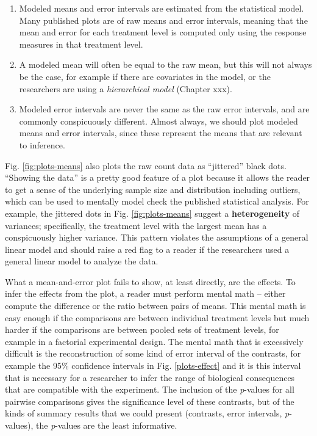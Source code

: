 \documentclass[]{book}
\providecommand{\tightlist}{%
  \setlength{\itemsep}{0pt}\setlength{\parskip}{0pt}}
\begin{document}
\begin{enumerate}
\def\labelenumi{\arabic{enumi}.}
\tightlist
\item
  Modeled means and error intervals are estimated from the statistical
  model. Many published plots are of raw means and error intervals,
  meaning that the mean and error for each treatment level is computed
  only using the response measures in that treatment level.
\item
  A modeled mean will often be equal to the raw mean, but this will not
  always be the case, for example if there are covariates in the model,
  or the researchers are using a \emph{hierarchical model} (Chapter
  xxx).
\item
  Modeled error intervals are never the same as the raw error intervals,
  and are commonly conspicuously different. Almost always, we should
  plot modeled means and error intervals, since these represent the
  means that are relevant to inference.
\end{enumerate}

Fig. \ref{fig:plots-means} also plots the raw count data as ``jittered''
black dots. ``Showing the data'' is a pretty good feature of a plot
because it allows the reader to get a sense of the underlying sample
size and distribution including outliers, which can be used to mentally
model check the published statistical analysis. For example, the
jittered dots in Fig. \ref{fig:plots-means} suggest a
\textbf{heterogeneity} of variances; specifically, the treatment level
with the largest mean has a conspicuously higher variance. This pattern
violates the assumptions of a general linear model and should raise a
red flag to a reader if the researchers used a general linear model to
analyze the data.

What a mean-and-error plot fails to show, at least directly, are the
effects. To infer the effects from the plot, a reader must perform
mental math -- either compute the difference or the ratio between pairs
of means. This mental math is easy enough if the comparisons are between
individual treatment levels but much harder if the comparisons are
between pooled sets of treatment levels, for example in a factorial
experimental design. The mental math that is excessively difficult is
the reconstruction of some kind of error interval of the contrasts, for
example the 95\% confidence intervals in Fig. \ref{plots-effect} and it
is this interval that is necessary for a researcher to infer the range
of biological consequences that are compatible with the experiment. The
inclusion of the \emph{p}-values for all pairwise comparisons gives the
significance level of these contrasts, but of the kinds of summary
results that we could present (contrasts, error intervals,
\emph{p}-values), the \emph{p}-values are the least informative.
\end{document}
